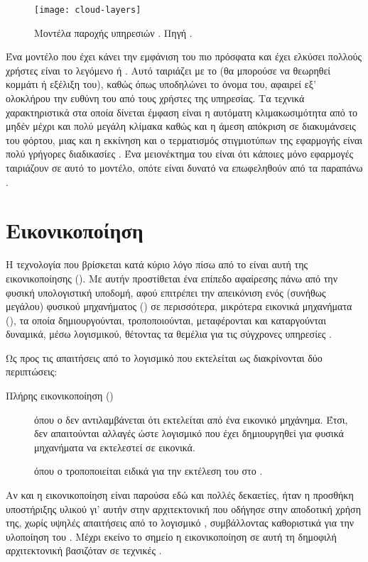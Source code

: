 \begin{figure}
    \centering
    \texttt{[image: cloud-layers]}
    \caption[Μοντέλα παροχής υπηρεσιών ]{Μοντέλα παροχής υπηρεσιών
        . Πηγή
        .}
    \label{fig:cloud}
\end{figure}

Ένα μοντέλο που έχει κάνει την εμφάνιση του πιο πρόσφατα και έχει ελκύσει
πολλούς χρήστες είναι το λεγόμενο  ή . Αυτό ταιριάζει με το  (θα μπορούσε να θεωρηθεί κομμάτι ή
εξέλιξη του), καθώς όπως υποδηλώνει το όνομα του, αφαιρεί εξ' ολοκλήρου την
ευθύνη του  από τους χρήστες της υπηρεσίας. Τα τεχνικά χαρακτηριστικά
στα οποία δίνεται έμφαση είναι η αυτόματη κλιμακωσιμότητα από το μηδέν μέχρι και
πολύ μεγάλη κλίμακα καθώς και η άμεση απόκριση σε διακυμάνσεις του φόρτου,
μιας και η εκκίνηση και ο τερματισμός στιγμιοτύπων της εφαρμογής είναι πολύ
γρήγορες διαδικασίες \cite{cloudflare-serverless}. Ένα μειονέκτημα του
 είναι ότι κάποιες μόνο εφαρμογές ταιριάζουν σε αυτό το μοντέλο,
οπότε είναι δυνατό να επωφεληθούν από τα παραπάνω \cite{serverless,
spec-serverless}.

\section{Εικονικοποίηση}
Η τεχνολογία που βρίσκεται κατά κύριο λόγο πίσω από το  είναι αυτή της
εικονικοποίησης (). Με αυτήν προστίθεται ένα επίπεδο
αφαίρεσης πάνω από την φυσική υπολογιστική υποδομή, αφού επιτρέπει την
απεικόνιση ενός (συνήθως μεγάλου) φυσικού μηχανήματος () σε
περισσότερα, μικρότερα εικονικά μηχανήματα (), τα
οποία δημιουργούνται, τροποποιούνται, μεταφέρονται και καταργούνται δυναμικά,
μέσω λογισμικού, θέτοντας τα θεμέλια για τις σύγχρονες υπηρεσίες 
\cite{wiki:hw-virtualization}.

Ως προς τις απαιτήσεις από το λογισμικό που εκτελείται ως \guest{} διακρίνονται
δύο περιπτώσεις:
\begin{description}
    \item[Πλήρης εικονικοποίηση ()] όπου ο \guest{} δεν
        αντιλαμβάνεται ότι εκτελείται από ένα εικονικό μηχάνημα. Έτσι, δεν
        απαιτούνται αλλαγές ώστε λογισμικό που έχει δημιουργηθεί για φυσικά
        μηχανήματα να εκτελεστεί σε εικονικά.
    \item[] όπου ο \guest{} τροποποιείται ειδικά για την
        εκτέλεση του στο .
\end{description}
Αν και η εικονικοποίηση είναι παρούσα εδώ και πολλές δεκαετίες,
ήταν η προσθήκη υποστήριξης υλικού γι' αυτήν στην αρχιτεκτονική  που
οδήγησε στην αποδοτική χρήση της, χωρίς υψηλές απαιτήσεις από το λογισμικό
\cite{virtualization-x86}, συμβάλλοντας καθοριστικά για την υλοποίηση του
. Μέχρι εκείνο το σημείο η εικονικοποίηση σε αυτή τη δημοφιλή
αρχιτεκτονική βασιζόταν σε τεχνικές .

